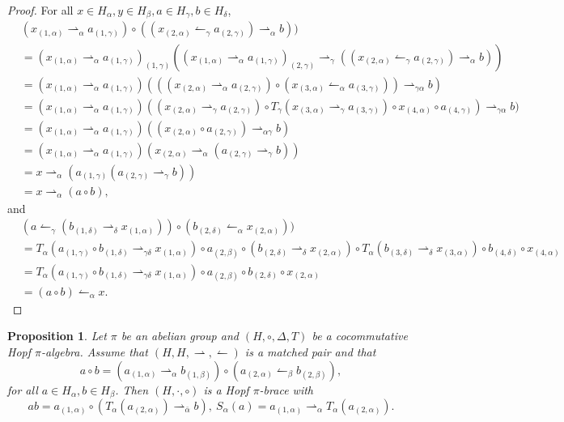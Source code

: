 \documentclass[11pt]{article}
\def\a{\alpha}
\def\b{\beta}
\def\d{\delta}
\def\g{\gamma}
\newtheorem{proposition}[theorem]{Proposition}
\begin{document}
\begin{proof}
For all $x\in H_\a,y\in H_\b,a\in H_\g,b\in H_\d$,
\begin{align*}
&(x_{(1,\a)}\rightharpoonup_{\a}a_{(1,\g)})\circ((x_{(2,\a)}\leftharpoonup_{\g}a_{(2,\g)})\rightharpoonup_\a b))\\
&=(x_{(1,\a)}\rightharpoonup_{\a}a_{(1,\g)})_{(1,\g)}((x_{(1,\a)}\rightharpoonup_{\a}a_{(1,\g)})_{(2,\g)}\rightharpoonup_\g((x_{(2,\a)}\leftharpoonup_{\g}a_{(2,\g)})\rightharpoonup_\a b))\\
&=(x_{(1,\a)}\rightharpoonup_{\a}a_{(1,\g)})(((x_{(2,\a)}\rightharpoonup_{\a}a_{(2,\g)})\circ(x_{(3,\a)}\leftharpoonup_{\a}a_{(3,\g)}))\rightharpoonup_{\g\a} b)\\
&=(x_{(1,\a)}\rightharpoonup_{\a}a_{(1,\g)})((x_{(2,\a)}\rightharpoonup_{\g}a_{(2,\g)})\circ T_\g(x_{(3,\a)}\rightharpoonup_\g a_{(3,\g)})\circ x_{(4,\a)}\circ a_{(4,\g)})\rightharpoonup_{\g\a} b)\\
&=(x_{(1,\a)}\rightharpoonup_{\a}a_{(1,\g)})( (x_{(2,\a)}\circ a_{(2,\g)})\rightharpoonup_{\a\g} b)\\
&=(x_{(1,\a)}\rightharpoonup_{\a}a_{(1,\g)})(x_{(2,\a)}\rightharpoonup_\a (a_{(2,\g)}\rightharpoonup_\g b))\\
&=x\rightharpoonup_{\a}( a_{(1,\g)}(a_{(2,\g)}\rightharpoonup_\g b))\\
&=x\rightharpoonup_{\a}(a\circ b),
\end{align*}
and
\begin{align*}
&(a\leftharpoonup_\g(b_{(1,\d)}\rightharpoonup_\d x_{(1,\a)}))\circ(b_{(2,\d)}\leftharpoonup_\a x_{(2,\a)}))\\
&=T_\a(a_{(1,\g)}\circ b_{(1,\d)}\rightharpoonup_{\g\d} x_{(1,\a)})\circ a_{(2,\b)}\circ(b_{(2,\d)}\rightharpoonup_\d x_{(2,\a)})\circ T_\a(b_{(3,\d)}\rightharpoonup_\d x_{(3,\a)})\circ b_{(4,\d)}\circ x_{(4,\a)}\\
&=T_\a(a_{(1,\g)}\circ b_{(1,\d)}\rightharpoonup_{\g\d} x_{(1,\a)})\circ a_{(2,\b)}\circ b_{(2,\d)}\circ x_{(2,\a)}\\
&=(a\circ b)\leftharpoonup_\a x.
\end{align*}
\end{proof}

\begin{proposition}\label{pro:mp}
Let $\pi$ be an abelian group and  $(H,\circ,\Delta,T)$ be a cocommutative Hopf $\pi$-algebra. Assume that $(H,H,\rightharpoonup,\leftharpoonup)$ is a matched pair and that 
\begin{equation}\label{mp6}
a\circ b=(a_{(1,\a)}\rightharpoonup_\a b_{(1,\b)})\circ(a_{(2,\a)}\leftharpoonup_\b b_{(2,\b)}),
\end{equation}
for all $a\in H_\a,b\in H_\b$. Then $(H,\cdot,\circ)$ is a Hopf $\pi$-brace with
$$ab=a_{(1,\a)}\circ(T_\a(a_{(2,\a)})\rightharpoonup_{\bar{\a}}b),\ S_\a(a)=a_{(1,\a)}\rightharpoonup_\a T_\a(a_{(2,\a)}).$$
\end{proposition}
\end{document}
